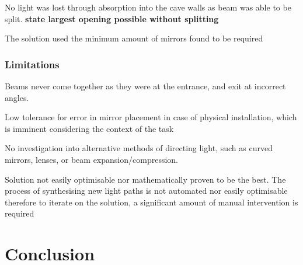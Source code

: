 \documentclass[11pt, letterpaper]{article}
\begin{document}
No light was lost through absorption into the cave walls as beam was able to be split. \textbf{state largest opening possible without splitting}

The solution used the minimum amount of mirrors found to be required
	
\subsubsection{Limitations}
	
Beams never come together as they were at the entrance, and exit at incorrect angles. 

Low tolerance for error in mirror placement in case of physical installation, which is imminent considering the context of the task

No investigation into alternative methods of directing light, such as curved mirrors, lenses, or beam expansion/compression.
		
Solution not easily optimisable nor mathematically proven to be the best. The process of synthesising new light paths is not automated nor easily optimisable therefore to iterate on the solution, a significant amount of manual intervention is required
		
		
	
\section{Conclusion}
	
	
\newpage


	
\end{document}
